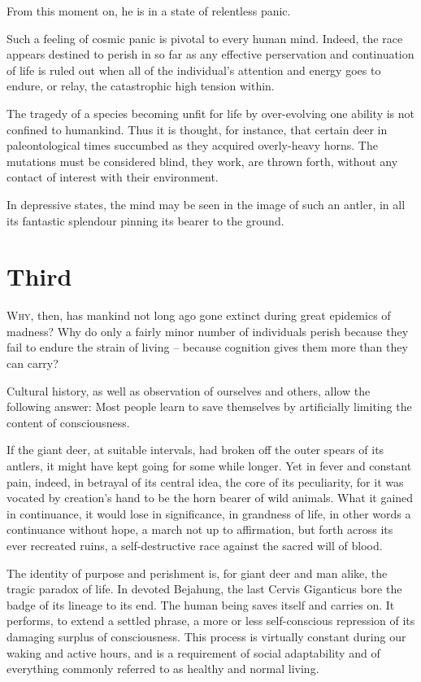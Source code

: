 \documentclass[draft,a4paper,10pt,twocolumn]{article}
\begin{document}
From this moment on, he is in a state of relentless panic.

Such a feeling of cosmic panic is pivotal to every human mind. Indeed, the race appears destined to perish in so far as any effective perservation and continuation of life is ruled out when all of the individual's attention and energy goes to endure, or relay, the catastrophic high tension within.

The tragedy of a species becoming unfit for life by over-evolving one ability is not confined to humankind. Thus it is thought, for instance, that certain deer in paleontological times succumbed as they acquired overly-heavy horns. The mutations must be considered blind, they work, are thrown forth, without any contact of interest with their environment.

In depressive states, the mind may be seen in the image of such an antler, in all its fantastic splendour pinning its bearer to the ground.

\section{Third}

\lettrine[lines=2]{W}{hy}, then, has mankind not long ago gone extinct during great epidemics of madness? Why do only a fairly minor number of individuals perish because they fail to endure the strain of living -- because cognition gives them more than they can carry?

Cultural history, as well as observation of ourselves and others, allow the following answer: Most people learn to save themselves by artificially limiting the content of consciousness.

If the giant deer, at suitable intervals, had broken off the outer spears of its antlers, it might have kept going for some while longer. Yet in fever and constant pain, indeed, in betrayal of its central idea, the core of its peculiarity, for it was vocated by creation's hand to be the horn bearer of wild animals. What it gained in continuance, it would lose in significance, in grandness of life, in other words a continuance without hope, a march not up to affirmation, but forth across its ever recreated ruins, a self-destructive race against the sacred will of blood.

The identity of purpose and perishment is, for giant deer and man alike, the tragic paradox of life. In devoted Bejahung, the last Cervis Giganticus bore the badge of its lineage to its end. The human being saves itself and carries on. It performs, to extend a settled phrase, a more or less self-conscious repression of its damaging surplus of consciousness. This process is virtually constant during our waking and active hours, and is a requirement of social adaptability and of everything commonly referred to as healthy and normal living.
\end{document}
